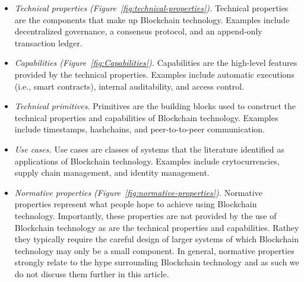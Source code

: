 \begin{itemize}
	\item \emph{Technical properties (Figure~\ref{fig:technical-properties}).}
	Technical properties are the components that make up Blockchain technology. 
	Examples include decentralized governance, a consensus protocol, and an 
	append-only transaction ledger.
	
	\item \emph{Capabilities (Figure~\ref{fig:Capabilities}).}
	Capabilities are the high-level features provided by the technical 
	properties. Examples include automatic executions (i.e., smart contracts), 
	internal auditability, and access control.
	
	\item \emph{Technical primitives.}
	Primitives are the building blocks used to construct the technical properties and capabilities of Blockchain technology. Examples include timestamps, hashchains, and peer-to-to-peer communication.
	
	\item \emph{Use cases.}
	Use cases are classes of systems that the literature identified as 
	applications of Blockchain technology. Examples include crytocurrencies, 
	supply chain management, and identity management.
	
	\item \emph{Normative properties (Figure~\ref{fig:normative-properties}).}
	Normative properties represent what people hope to achieve using Blockchain technology. 
	Importantly, these properties are not provided by the use of Blockchain 
	technology as are the technical properties and capabilities. Rathey they 
	typically require the careful design of larger systems of which Blockchain 
	technology may only be a small component.
	In general, normative properties strongly relate to the hype surrounding Blockchain technology%
	and as such we do not discuss them further in this article.
\end{itemize}

